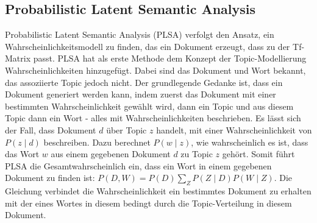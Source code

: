 \documentclass[german,version-2020-11]{uzl-thesis}
\begin{document}
\subsection{Probabilistic Latent Semantic Analysis}
Probabilistic Latent Semantic Analysis (PLSA) verfolgt den Ansatz, ein Wahrscheinlichkeitsmodell zu finden, das ein Dokument erzeugt, dass zu der Tf-Matrix passt. PLSA hat als erste Methode dem Konzept der Topic-Modellierung Wahrscheinlichkeiten hinzugefügt. Dabei sind das Dokument und Wort bekannt, das assoziierte Topic jedoch nicht. Der grundlegende Gedanke ist, dass ein Dokument generiert werden kann, indem zuerst das Dokument mit einer bestimmten Wahrscheinlichkeit gewählt wird, dann ein Topic und aus diesem Topic dann ein Wort - alles mit Wahrscheinlichkeiten beschrieben. Es lässt sich der Fall, dass Dokument $d$ über Topic $z$ handelt, mit einer Wahrscheinlichkeit von $P(z \mid d)$ beschreiben. Dazu berechnet $P(w \mid z)$, wie wahrscheinlich es ist, dass das Wort $w$ aus einem gegebenen Dokument $d$ zu Topic $z$ gehört. Somit führt PLSA die Gesamtwahrscheinlich ein, dass ein Wort in einem gegebenen Dokument zu finden ist: $P(D,W) = P(D) \sum_{Z}{P(Z\mid D)P(W\mid Z)}$. Die Gleichung verbindet die Wahrscheinlichkeit ein bestimmtes Dokument zu erhalten mit der eines Wortes in diesem bedingt durch die Topic-Verteilung in diesem Dokument. 
\end{document}
